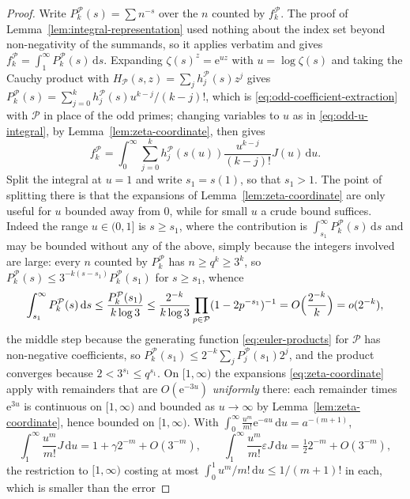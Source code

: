 \documentclass[11pt]{amsart}
\theoremstyle{plain}
\theoremstyle{definition}
\newcommand{\e}{\mathrm e}
\newcommand{\dd}{\,\mathrm d}
\begin{document}
\begin{proof}
Write $P_k^{\mathcal P}(s)=\sum n^{-s}$ over the $n$ counted by
$f_k^{\mathcal P}$. The proof of
Lemma~\ref{lem:integral-representation} used nothing about the index set beyond
non-negativity of the summands, so it applies verbatim and gives
$f_k^{\mathcal P}=\int_1^\infty P_k^{\mathcal P}(s)\dd s$. Expanding
$\zeta(s)^z=\e^{uz}$ with $u=\log\zeta(s)$ and taking the Cauchy product with
$H_{\mathcal P}(s,z)=\sum_jh_j^{\mathcal P}(s)z^j$ gives
$P_k^{\mathcal P}(s)=\sum_{j=0}^kh_j^{\mathcal P}(s)u^{k-j}/(k-j)!$, which is
\eqref{eq:odd-coefficient-extraction} with $\mathcal P$ in place of the odd
primes; changing variables to $u$ as in \eqref{eq:odd-u-integral}, by
Lemma~\ref{lem:zeta-coordinate}, then gives
\[
  f_k^{\mathcal P}
   =\int_0^\infty\sum_{j=0}^k h_j^{\mathcal P}(s(u))
     \frac{u^{k-j}}{(k-j)!}J(u)\dd u .
\]
Split the integral at $u=1$ and write $s_1=s(1)$, so that $s_1>1$. The point
of splitting there is that the expansions of
Lemma~\ref{lem:zeta-coordinate} are only useful for $u$ bounded away from $0$,
while for small $u$ a crude bound suffices. Indeed the range $u\in(0,1]$ is
$s\geq s_1$, where the contribution is
$\int_{s_1}^\infty P_k^{\mathcal P}(s)\dd s$ and may be bounded without any of the
above, simply because the integers involved are large: every $n$ counted by
$P_k^{\mathcal P}$ has $n\geq q^k\geq3^k$, so
$P_k^{\mathcal P}(s)\leq3^{-k(s-s_1)}P_k^{\mathcal P}(s_1)$ for $s\geq s_1$,
whence
\[
  \int_{s_1}^\infty P_k^{\mathcal P}(s)\dd s
   \leq\frac{P_k^{\mathcal P}(s_1)}{k\log3}
   \leq\frac{2^{-k}}{k\log3}\prod_{p\in\mathcal P}(1-2p^{-s_1})^{-1}
   =O\Bigl(\frac{2^{-k}}{k}\Bigr)=o(2^{-k}),
\]
the middle step because the generating function \eqref{eq:euler-products} for
$\mathcal P$ has non-negative coefficients, so
$P_k^{\mathcal P}(s_1)\leq2^{-k}\sum_jP_j^{\mathcal P}(s_1)2^j$, and the
product converges because $2<3^{s_1}\leq q^{s_1}$. On $[1,\infty)$ the
expansions \eqref{eq:zeta-coordinate} apply with remainders that are
$O(\e^{-3u})$ \emph{uniformly} there: each remainder times $\e^{3u}$ is
continuous on $[1,\infty)$ and bounded as $u\to\infty$ by
Lemma~\ref{lem:zeta-coordinate}, hence bounded on $[1,\infty)$. With
$\int_0^\infty\frac{u^m}{m!}\e^{-au}\dd u=a^{-(m+1)}$,
\begin{equation}\label{eq:gen-moments}
  \int_1^\infty\frac{u^m}{m!}J\dd u=1+\gamma2^{-m}+O(3^{-m}),
  \qquad
  \int_1^\infty\frac{u^m}{m!}\varepsilon J\dd u=\tfrac12 2^{-m}+O(3^{-m}),
\end{equation}
the restriction to $[1,\infty)$ costing at most
$\int_0^1u^m/m!\dd u\leq1/(m+1)!$ in each, which is smaller than the error

\end{proof}
\end{document}
